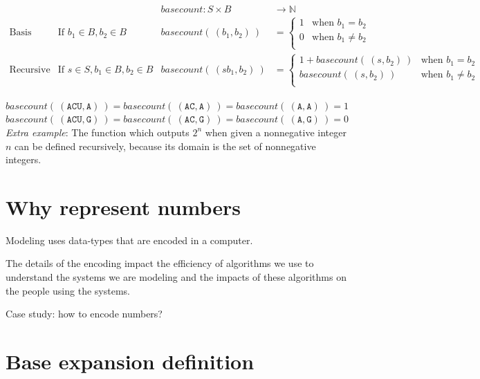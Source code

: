 \documentclass[12pt, oneside]{article}
\newcommand{\A}[0]{\texttt{A}}
\newcommand{\C}[0]{\texttt{C}}
\newcommand{\G}[0]{\texttt{G}}
\newcommand{\U}[0]{\texttt{U}}
\begin{document}
\[
\begin{array}{llll}
& & \textit{basecount} : S \times B & \to \mathbb{N} \\
\textrm{Basis Step:} &  \textrm{If } b_1 \in B, b_2 \in B & \textit{basecount}(~(b_1, b_2)~) & =
        \begin{cases}
            1 & \textrm{when } b_1 = b_2 \\
            0 & \textrm{when } b_1 \neq b_2 \\
        \end{cases} \\
\textrm{Recursive Step:} & \textrm{If } s \in S, b_1 \in B, b_2 \in B &\textit{basecount}(~(s b_1, b_2)~) & =
        \begin{cases}
            1 + \textit{basecount}(~(s, b_2)~) & \textrm{when } b_1 = b_2 \\
            \textit{basecount}(~(s, b_2)~) & \textrm{when } b_1 \neq b_2 \\
        \end{cases}
\end{array}
\]

$basecount(~(\A\C\U,\A)~) = basecount( ~(\A\C, \A)~) = basecount(~(\A, \A)~) = 1$\\


$basecount(~(\A\C\U,\G)~) = basecount( ~(\A\C, \G)~) = basecount(~(\A, \G)~) = 0$\\


\vfill
{\it Extra example}: The function which outputs $2^n$ when given a nonnegative integer $n$ can be defined recursively, 
because its domain is the set of nonnegative integers.

\vfill
 \vfill
\section*{Why represent numbers}


Modeling uses data-types that are 
encoded in a computer.

The details of the encoding impact the efficiency of algorithms
we use to understand the systems we are modeling and the 
impacts of these algorithms on the people using the systems.

Case study: how to encode numbers?

\vfill \vfill
\section*{Base expansion definition}
\end{document}
